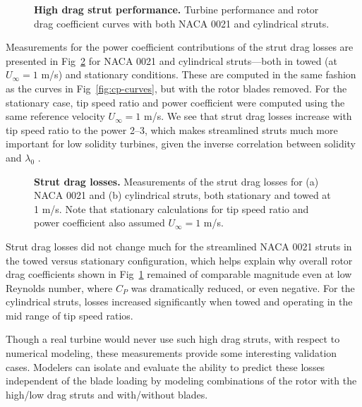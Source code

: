 \documentclass[10pt,letterpaper]{article}
\begin{document}
\begin{figure}

    \caption{{\bf High drag strut performance.} Turbine performance and rotor
        drag coefficient curves with both NACA 0021 and cylindrical struts.}

    \label{fig:perf-covers}
\end{figure}

Measurements for the power coefficient contributions of the strut drag losses
are presented in Fig~\ref{fig:no-blades} for NACA 0021 and cylindrical
struts---both in towed (at $U_\infty=1$ m/s) and stationary conditions. These
are computed in the same fashion as the curves in Fig~\ref{fig:cp-curves}, but
with the rotor blades removed. For the stationary case, tip speed ratio and
power coefficient were computed using the same reference velocity $U_\infty=1$
m/s. We see that strut drag losses increase with tip speed ratio to the power
2--3, which makes streamlined struts much more important for low solidity
turbines, given the inverse correlation between solidity and $\lambda_0$
\cite{Templin1974}.

\begin{figure}

    \caption{{\bf Strut drag losses.} Measurements of the strut drag losses for
    (a) NACA 0021 and (b) cylindrical struts, both stationary and towed at 1
    m/s. Note that stationary calculations for tip speed ratio and power
    coefficient also assumed $U_\infty = 1$ m/s.}

    \label{fig:no-blades}
\end{figure}

Strut drag losses did not change much for the streamlined NACA 0021 struts in
the towed versus stationary configuration, which helps explain why overall rotor
drag coefficients shown in Fig~\ref{fig:perf-covers} remained of comparable
magnitude even at low Reynolds number, where $C_P$ was dramatically reduced, or
even negative. For the cylindrical struts, losses increased significantly when
towed and operating in the mid range of tip speed ratios.

Though a real turbine would never use such high drag struts, with respect to
numerical modeling, these measurements provide some interesting validation
cases. Modelers can isolate and evaluate the ability to predict these losses
independent of the blade loading by modeling combinations of the rotor with the
high/low drag struts and with/without blades.
\end{document}
